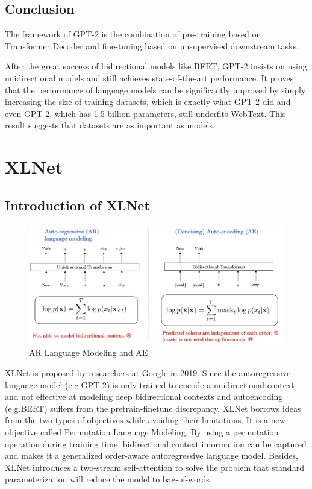 \documentclass[]{krantz}
\begin{document}
\hypertarget{conclusion}{%
\subsection{Conclusion}\label{conclusion}}

The framework of GPT-2 is the combination of pre-training based on Transformer Decoder and fine-tuning based on unsupervised downstream tasks.

After the great success of bidirectional models like BERT, GPT-2 insists on using unidirectional models and still achieves state-of-the-art performance. It proves that the performance of language models can be significantly improved by simply increasing the size of training datasets, which is exactly what GPT-2 did and even GPT-2, which has 1.5 billion parameters, still underfits WebText. This result suggests that datasets are as important as models.

\hypertarget{xlnet}{%
\section{XLNet}\label{xlnet}}

\hypertarget{introduction-of-xlnet}{%
\subsection{Introduction of XLNet}\label{introduction-of-xlnet}}

\begin{figure}

{\centering \includegraphics[width=0.9\linewidth]{figures/02-03-transfer-learning-for-nlp/xlnet_twomodels} 

}

\caption{AR Language Modeling  and AE}\label{fig:ch02-03-figure09}
\end{figure}

XLNet is proposed by researchers at Google in 2019. Since the autoregressive language model (e.g.GPT-2) is only trained to encode a unidirectional context and not effective at modeling deep bidirectional contexts and autoencoding (e.g.BERT) suffers from the pretrain-finetune discrepancy, XLNet borrows ideas from the two types of objectives while avoiding their limitations. It is a new objective called Permutation Language Modeling. By using a permutation operation during training time, bidirectional context information can be captured and makes it a generalized order-aware autoregressive language model. Besides, XLNet introduces a two-stream self-attention to solve the problem that standard parameterization will reduce the model to bag-of-words.
\end{document}
